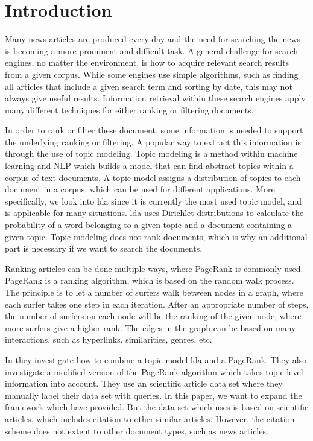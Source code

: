 \section{Introduction} 


Many news articles are produced every day and the need for searching the news is becoming a more prominent and difficult task.
A general challenge for search engines, no matter the environment, is how to acquire relevant search results from a given corpus. 
While some engines use simple algorithms, such as finding all articles that include a given search term and sorting by date, this may not always give useful results.
Information retrieval within these search engines apply many different techniques for either ranking or filtering documents\cite{google_pagerank2006}.

In order to rank or filter these document, some information is needed to support the underlying ranking or filtering.
A popular way to extract this information is through the use of topic modeling.
Topic modeling is a method within machine learning and \gls{NLP} which builds a model that can find abstract topics within a corpus of text documents.
A topic model assigns a distribution of topics to each document in a corpus, which can be used for different applications.
More specifically, we look into \gls{lda} since it is currently the most used topic model, and is applicable for many situations\cite{lda}.
\gls{lda} uses Dirichlet distributions to calculate the probability of a word belonging to a given topic and a document containing a given topic.
Topic modeling does not rank documents, which is why an additional part is necessary if we want to search the documents.

Ranking articles can be done multiple ways, where PageRank is commonly used\cite{google_pagerank2006}.
PageRank\cite{pagerank_1999} is a ranking algorithm, which is based on the random walk process.
The principle is to let a number of surfers walk between nodes in a graph, where each surfer takes one step in each iteration.
After an appropriate number of steps, the number of surfers on each node will be the ranking of the given node, where more surfers give a higher rank.
The edges in the graph can be based on many interactions, such as hyperlinks, similarities, genres, etc.

In \cite{yang2009topic} they investigate how to combine a topic model \gls{lda} and a PageRank.
They also investigate a modified version of the PageRank algorithm which takes topic-level information into account.
They use an scientific article data set where they manually label their data set with queries. 
In this paper, we want to expand the framework which \cite{yang2009topic} have provided.
But the data set which \cite{yang2009topic} uses is based on scientific articles, which includes citation to other similar articles.
However, the citation scheme does not extent to other document types, such as news articles.

